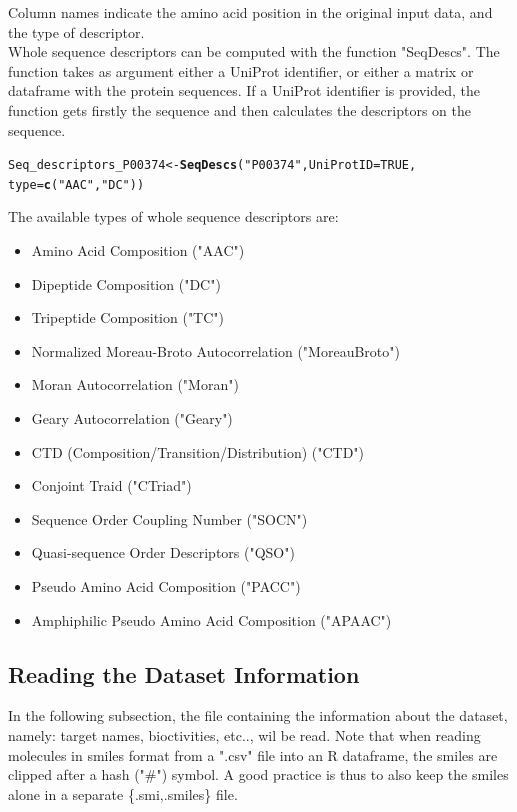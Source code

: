 \documentclass[twoside,a4wide,12pt]{article}\usepackage[]{graphicx}\usepackage[]{color}
\makeatletter
\newcommand{\hlnum}[1]{\textcolor[rgb]{0.686,0.059,0.569}{#1}}%
\newcommand{\hlstr}[1]{\textcolor[rgb]{0.192,0.494,0.8}{#1}}%
\newcommand{\hlstd}[1]{\textcolor[rgb]{0.345,0.345,0.345}{#1}}%
\newcommand{\hlkwb}[1]{\textcolor[rgb]{0.69,0.353,0.396}{#1}}%
\newcommand{\hlkwc}[1]{\textcolor[rgb]{0.333,0.667,0.333}{#1}}%
\newcommand{\hlkwd}[1]{\textcolor[rgb]{0.737,0.353,0.396}{\textbf{#1}}}%
\newenvironment{kframe}{%
 \def\at@end@of@kframe{}%
 \ifinner\ifhmode%
  \def\at@end@of@kframe{\end{minipage}}%
  \begin{minipage}{\columnwidth}%
 \fi\fi%
 \def\FrameCommand##1{\hskip\@totalleftmargin \hskip-\fboxsep
 \colorbox{shadecolor}{##1}\hskip-\fboxsep
     \hskip-\linewidth \hskip-\@totalleftmargin \hskip\columnwidth}%
 \MakeFramed {\advance\hsize-\width
   \@totalleftmargin\z@ \linewidth\hsize
   \@setminipage}}%
 {\par\unskip\endMakeFramed%
 \at@end@of@kframe}
\newenvironment{knitrout}{}{} %
\makeatother
\begin{document}
Column names indicate the amino acid position in the original input data, and the type of descriptor.
\\
Whole sequence descriptors can be computed with the function "SeqDescs". 
The function takes as argument either a UniProt identifier, or either a matrix or dataframe with the protein sequences.
If a UniProt identifier is provided, the function gets firstly the sequence and then calculates the descriptors on the sequence.

\begin{knitrout}
\color{fgcolor}\begin{kframe}
\begin{alltt}
\hlstd{Seq_descriptors_P00374} \hlkwb{<-} \hlkwd{SeqDescs}\hlstd{(}\hlstr{"P00374"}\hlstd{,} \hlkwc{UniProtID} \hlstd{=} \hlnum{TRUE}\hlstd{,}
    \hlkwc{type} \hlstd{=} \hlkwd{c}\hlstd{(}\hlstr{"AAC"}\hlstd{,} \hlstr{"DC"}\hlstd{))}
\end{alltt}
\end{kframe}
\end{knitrout}

The available types of whole sequence descriptors are:\cite{protr}
\begin{itemize}
\item Amino Acid Composition ("AAC")
\item Dipeptide Composition ("DC")
\item Tripeptide Composition ("TC")
\item Normalized Moreau-Broto Autocorrelation ("MoreauBroto")
\item Moran Autocorrelation ("Moran")
\item Geary Autocorrelation ("Geary")
\item  CTD (Composition/Transition/Distribution) ("CTD")
\item Conjoint Traid ("CTriad")
\item Sequence Order Coupling Number ("SOCN")
\item Quasi-sequence Order Descriptors ("QSO")
\item Pseudo Amino Acid Composition ("PACC")
\item Amphiphilic Pseudo Amino Acid Composition ("APAAC")
\end{itemize}

\subsection{Reading the Dataset Information}
In the following subsection, 
the file containing the information about the dataset, namely: target names, bioctivities, etc.., wil be read.
Note that when reading molecules in smiles format from a ".csv" file into an R dataframe, the smiles are clipped after a hash ("\#") symbol.
A good practice is thus to also keep the smiles alone in a separate \{.smi,.smiles\} file.
\end{document}
